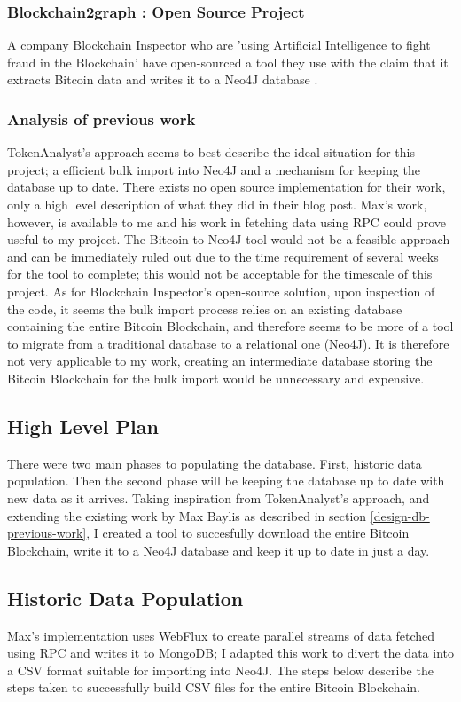 \subsubsection{Blockchain2graph : Open Source Project}
A company Blockchain Inspector who are 'using Artificial Intelligence to fight fraud in the Blockchain' have open-sourced a tool they use with the claim that it extracts Bitcoin data and writes it to a Neo4J database \cite{RefWorks:doc:5cac6184e4b01c076c63e173}.

\subsubsection{Analysis of previous work}
TokenAnalyst's approach seems to best describe the ideal situation for this project; a efficient bulk import into Neo4J and a mechanism for keeping the database up to date. There exists no open source implementation for their work, only a high level description of what they did in their blog post. Max's work, however, is available to me and his work in fetching data using RPC could prove useful to my project. The Bitcoin to Neo4J tool would not be a feasible approach and can be immediately ruled out due to the time requirement of several weeks for the tool to complete; this would not be acceptable for the timescale of this project. As for Blockchain Inspector's open-source solution, upon inspection of the code, it seems the bulk import process relies on an existing database containing the entire Bitcoin Blockchain, and therefore seems to be more of a tool to migrate from a traditional database to a relational one (Neo4J). It is therefore not very applicable to my work, creating an intermediate database storing the Bitcoin Blockchain for the bulk import would be unnecessary and expensive. 

\subsection{High Level Plan}
There were two main phases to populating the database. First, historic data population. Then the second phase will be keeping the database up to date with new data as it arrives. Taking inspiration from TokenAnalyst's approach, and extending the existing work by Max Baylis as described in section \ref{design-db-previous-work}, I created a tool to succesfully download the entire Bitcoin Blockchain, write it to a Neo4J database and keep it up to date in just a day.

\subsection{Historic Data Population}
Max's implementation uses WebFlux to create parallel streams of data fetched using RPC and writes it to MongoDB; I adapted this work to divert the data into a CSV format suitable for importing into Neo4J. The steps below describe the steps taken to successfully build CSV files for the entire Bitcoin Blockchain. 

